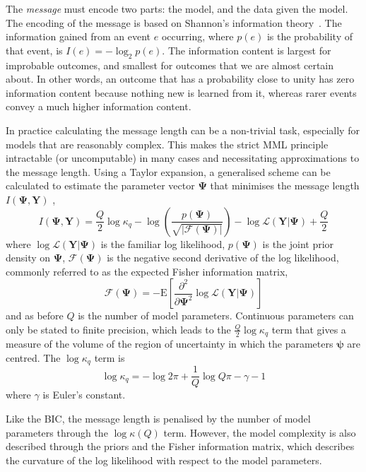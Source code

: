 \documentclass[twocolumn]{aastex62}
\newcommand{\vect}[1]{\boldsymbol{\mathbf{#1}}}
\renewcommand{\vec}[1]{\vect{#1}}
\newcommand{\data}{\textbf{Y}}
\newcommand{\vecdata}{\vec\data}
\newcommand{\likelihood}{\mathcal{L}}
\begin{document}
The \textit{message} must encode two parts: the model, and the data given the
model. The encoding of the message is based on Shannon's information theory~\citep{Shannon:1948}. 
The information gained from an event $e$ occurring, where $p(e)$ is the
probability of that event, is $I(e) = -\log_{2}{p(e)}$. The information content
is largest for improbable outcomes, and smallest for outcomes that we are 
almost certain about. In other words, an outcome that has a probability close
to unity has zero information content because nothing new is learned from it,
whereas rarer events convey a much higher information content. 

In practice calculating the message length can be a non-trivial task, 
especially for models that are reasonably complex. This makes the strict MML
principle intractable (or uncomputable) in many cases and necessitating 
approximations to the message length. Using a Taylor expansion, a generalised
scheme can be calculated to estimate the parameter vector $\vec\Psi$ that
minimises the message length ${I}(\vec\Psi,\vecdata)$ \citep{Wallace:1987},
\begin{equation}
	{I}(\vec\Psi,\vecdata) = \frac{Q}{2}\log\kappa_q - \log\left(\frac{p(\vec\Psi)}{\sqrt{|\mathcal{F}(\vec\Psi)|}}\right) - \log\mathcal{L}\left(\vecdata|\vec\Psi\right) + \frac{Q}{2} \label{eq:mml} 
\end{equation}
\noindent{}where $\log\likelihood(\vecdata|\vec\Psi)$ is the familiar
log likelihood, $p(\vec\Psi)$ is the joint prior density on $\vec\Psi$,
$\mathcal{F}(\vec\Psi)$ is the negative second derivative of the log likelihood,
commonly referred to as the expected Fisher information matrix,
\begin{equation}
	\mathcal{F}(\vec\Psi) = -\textrm{E}\left[\frac{\partial^2}{\partial\vec\Psi^2}\log\likelihood(\vecdata|\vec\Psi)\right]
\end{equation}
\noindent{}and as before $Q$ is the number of model parameters.
Continuous parameters can only be stated to finite precision, which leads
to the $\frac{Q}{2}\log\kappa_q$ term that gives a measure of the volume of the region of
uncertainty in which the parameters $\vec\psi$ are centred. The $\log\kappa_q$
term is
\begin{equation}
	\log\kappa_q = -\log{2\pi} + \frac{1}{Q}\log{Q\pi} - \gamma - 1
\end{equation}
\noindent{}where $\gamma$ is Euler's constant.

Like the BIC, the message length is penalised by the number of model parameters
through the $\log\kappa(Q)$ term. However, the model complexity is also 
described through the priors and the Fisher information matrix, which
describes the curvature of the log likelihood with respect to the model
parameters. 
\end{document}

